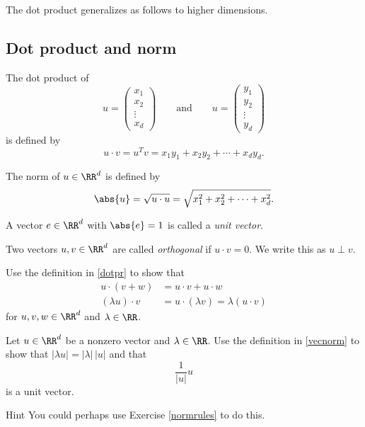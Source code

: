 \documentclass{article}
\begin{document}
The dot product generalizes as follows to higher dimensions.

\subsection{Dot product and norm}

\begin{definition}
The dot product of
$$
u =
\begin{pmatrix}
  x_1 \\
  x_2 \\
  \vdots
  \\
  x_d
\end{pmatrix}\qquad
\text{and}
\qquad
u =
\begin{pmatrix}
  y_1 \\
  y_2 \\
  \vdots
  \\
  y_d
\end{pmatrix}
$$
is defined by
\begin{equation}\label{dotpr}
u\cdot v = u^T v = x_1 y_1 + x_2 y_2 + \cdots + x_d y_d.
\end{equation}


The norm of $u\in \RR^d$ is defined by
\begin{equation}\label{vecnorm}
\abs{u} = \sqrt{u\cdot u} = \sqrt{x_1^2 + x_2^2 + \cdots + x_d^2}.
\end{equation}


A vector $e\in \RR^d$ with $\abs{e}=1$ is called a \emph{unit vector}.

Two vectors $u, v\in \RR^d$ are called \emph{orthogonal} if $u\cdot v = 0$. We write
this as $u \perp v$.

\end{definition}


\beginshex\label{normrules}
Use the definition in \eqref{dotpr} to show that
\begin{align*}
  u\cdot (v + w) &= u\cdot v + u\cdot w\\
  (\lambda u)\cdot v &= u\cdot (\lambda v) = \lambda (u\cdot v)
\end{align*}
for $u, v, w\in \RR^d$ and $\lambda\in\RR$.
\endshex


\beginshex
Let $u\in \RR^d$ be a nonzero vector and $\lambda\in \RR$. Use the definition
in \eqref{vecnorm} to show that
$|\lambda u| = |\lambda| \, |u|$ and that
$$
\frac{1}{|u|} u
$$
is a unit vector.

\begin{hideinbutton}{Hint}
You could perhaps use Exercise \ref{normrules} to do this.   
\end{hideinbutton}
\endshex
\end{document}
